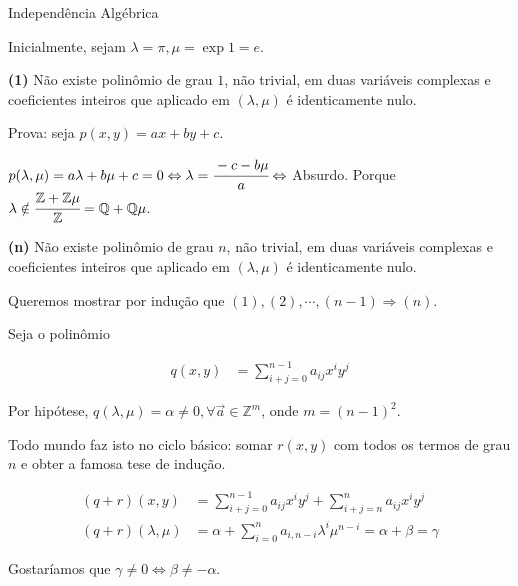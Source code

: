 \documentclass[12pt]{article}
\begin{document}
\LARGE

\begin{center}
Independ\^encia Alg\'ebrica
\end{center}

\large

Inicialmente, sejam $\lambda = \pi, \mu = \exp 1 = e$.

\textbf{(1)} N\~ao existe polin\^omio de grau $1$, n\~ao trivial, em duas vari\'aveis complexas e coeficientes inteiros que aplicado em $(\lambda, \mu)$ \'e identicamente nulo.

\vspace{3mm}

Prova: seja $p(x,y) = ax + by + c$.

$p(\lambda, \mu) = a\lambda + b\mu + c = 0 \Leftrightarrow \lambda = \cfrac{-c - b\mu}{a} \Leftrightarrow$ Absurdo. Porque $\lambda \notin \cfrac{\mathbb{Z} + \mathbb{Z}\mu}{\mathbb{Z}} = \mathbb{Q} + \mathbb{Q} \mu$.

\vspace{3mm}

\textbf{(n)} N\~ao existe polin\^omio de grau $n$, n\~ao trivial, em duas vari\'aveis complexas e coeficientes inteiros que aplicado em $(\lambda, \mu)$ \'e identicamente nulo.

\vspace{3mm}

Queremos mostrar por indu\c{c}\~ao que $(1),(2), \cdots, (n-1) \Rightarrow (n)$.

Seja o polin\^omio

\begin{align}
q(x,y) &= \sum_{i + j = 0}^{n - 1} a_{ij} x^i y^j
\end{align}

Por hip\'otese, $q(\lambda, \mu) = \alpha \ne 0, \forall \vec a \in \mathbb{Z}^m$, onde $m = (n - 1)^2$.

Todo mundo faz isto no ciclo b\'asico: somar $r(x,y)$ com todos os termos de grau $n$ e obter a famosa tese de indu\c{c}\~ao.

\begin{align}
(q + r)(x,y) &= \sum_{i + j = 0}^{n - 1} a_{ij} x^i y^j + \sum_{i + j = n}^n a_{ij} x^i y^j \\
(q + r)(\lambda,\mu) &= \alpha + \sum_{i= 0}^n a_{i,n-i} \lambda^i \mu^{n-i} = \alpha + \beta = \gamma
\end{align}

Gostar\'iamos que $\gamma \ne 0 \Leftrightarrow \beta \ne - \alpha$.
\end{document}
